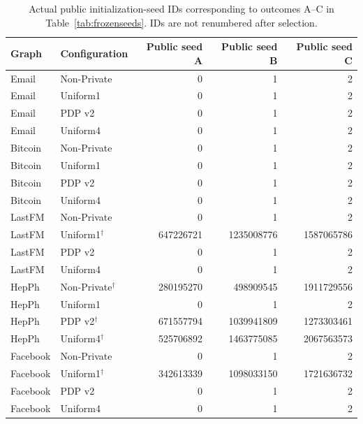 \begin{table}[htbp]
\centering\scriptsize
\caption{Actual public initialization-seed IDs corresponding to outcomes A--C in Table~\ref{tab:frozenseeds}. IDs are not renumbered after selection.}\label{tab:frozenseedids}
\begin{tabular}{llrrr}
\toprule
Graph & Configuration & Public seed A & Public seed B & Public seed C\\ \midrule
Email & Non-Private & 0 & 1 & 2 \\
Email & Uniform1 & 0 & 1 & 2 \\
Email & PDP v2 & 0 & 1 & 2 \\
Email & Uniform4 & 0 & 1 & 2 \\
Bitcoin & Non-Private & 0 & 1 & 2 \\
Bitcoin & Uniform1 & 0 & 1 & 2 \\
Bitcoin & PDP v2 & 0 & 1 & 2 \\
Bitcoin & Uniform4 & 0 & 1 & 2 \\
LastFM & Non-Private & 0 & 1 & 2 \\
LastFM & Uniform1$^{\dagger}$ & 647226721 & 1235008776 & 1587065786 \\
LastFM & PDP v2 & 0 & 1 & 2 \\
LastFM & Uniform4 & 0 & 1 & 2 \\
HepPh & Non-Private$^{\dagger}$ & 280195270 & 498909545 & 1911729556 \\
HepPh & Uniform1 & 0 & 1 & 2 \\
HepPh & PDP v2$^{\dagger}$ & 671557794 & 1039941809 & 1273303461 \\
HepPh & Uniform4$^{\dagger}$ & 525706892 & 1463775085 & 2067563573 \\
Facebook & Non-Private & 0 & 1 & 2 \\
Facebook & Uniform1$^{\dagger}$ & 342613339 & 1098033150 & 1721636732 \\
Facebook & PDP v2 & 0 & 1 & 2 \\
Facebook & Uniform4 & 0 & 1 & 2 \\
\bottomrule\end{tabular}
\end{table}
